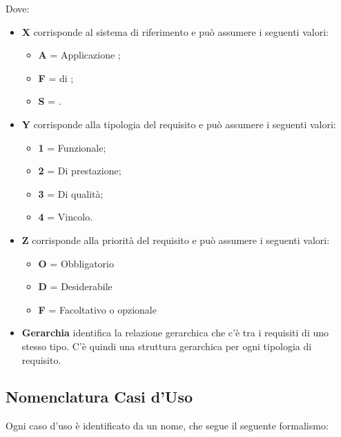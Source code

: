 Dove:
\begin{itemize}
 \item \textbf{X} corrisponde al sistema di riferimento e può assumere i seguenti valori:
	\begin{itemize}
	 \item[] \textbf{A} = Applicazione ;
	 \item[] \textbf{F} =  di ;
	 \item[] \textbf{S} = .
	\end{itemize}

 \item \textbf{Y} corrisponde alla tipologia del requisito e può assumere i seguenti valori:
	\begin{itemize}
	 \item[] \textbf{1} = Funzionale;
	 \item[] \textbf{2} = Di prestazione;
	 \item[] \textbf{3} = Di qualità;
	 \item[] \textbf{4} = Vincolo.
	\end{itemize}

 \item \textbf{Z} corrisponde alla priorità del requisito e può assumere i seguenti valori:
	\begin{itemize}
	 \item[] \textbf{O} = Obbligatorio
	 \item[] \textbf{D} = Desiderabile
	 \item[] \textbf{F} = Facoltativo o opzionale
	\end{itemize}

 \item \textbf{Gerarchia} identifica la relazione gerarchica che c'è tra i requisiti di uno stesso tipo. C'è quindi una struttura gerarchica per ogni tipologia di requisito.
\end{itemize}

\subsection{Nomenclatura Casi d'Uso}

Ogni caso d'uso è identificato da un nome, che segue il seguente formalismo:
\begin{center}
\end{center}

